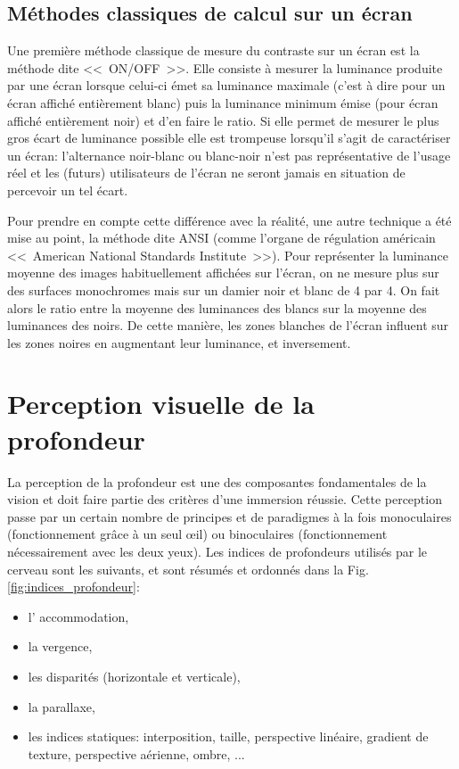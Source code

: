 	\section{Méthodes classiques de calcul sur un écran}
	\par Une première méthode classique de mesure du contraste sur un écran est la méthode dite <<~ON/OFF~>>. Elle consiste à mesurer la luminance produite par une écran lorsque celui-ci émet sa luminance maximale (c'est à dire pour un écran affiché entièrement blanc) puis la luminance minimum émise (pour écran affiché entièrement noir) et d'en faire le ratio. Si elle permet de mesurer le plus gros écart de luminance possible elle est trompeuse lorsqu'il s'agit de caractériser un écran: l'alternance noir-blanc ou blanc-noir n'est pas représentative de l'usage réel et les (futurs) utilisateurs de l'écran ne seront jamais en situation de percevoir un tel écart.
	
	\par Pour prendre en compte cette différence avec la réalité, une autre technique a été mise au point, la méthode dite ANSI (comme l'organe de régulation américain <<~American National Standards Institute~>>). Pour représenter la luminance moyenne des images habituellement affichées sur l'écran, on ne mesure plus sur des surfaces monochromes mais sur un damier noir et blanc de 4 par 4. On fait alors le ratio entre la moyenne des luminances des blancs sur la moyenne des luminances des noirs. De cette manière, les zones blanches de l'écran influent sur les zones noires en augmentant leur luminance, et inversement.
	
\chapter{Perception visuelle de la profondeur}
	\par La perception de la profondeur est une des composantes fondamentales de la vision et doit faire partie des critères d'une immersion réussie. Cette perception passe par un certain nombre de principes et de paradigmes à la fois monoculaires (fonctionnement grâce à un seul œil) ou binoculaires (fonctionnement nécessairement avec les deux yeux). Les indices de profondeurs utilisés par le cerveau sont les suivants, et sont résumés et ordonnés dans la Fig. \ref{fig:indices_profondeur}:
	\begin{itemize}
	\item l' accommodation,
	\item la vergence,
	\item les disparités (horizontale et verticale),
	\item la parallaxe,
	\item les indices statiques: interposition, taille, perspective linéaire, gradient de texture, perspective aérienne, ombre, ...
	\end{itemize}
	
